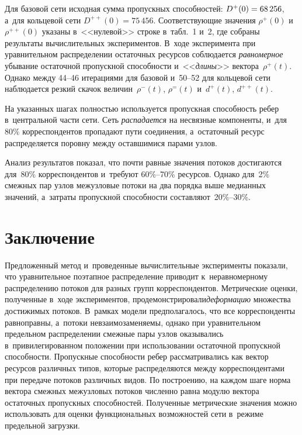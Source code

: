\begin{multicols}{2}
Для базовой сети исходная сумма пропускных способностей:
$D^+(0)\hm=68\,256$, а~для кольцевой сети $D^{++}(0)=75\,456$.
Соответствующие значения $\rho^+(0)$ и~$\rho^{++}(0)$ указаны в~<<нулевой>> строке 
в~табл.~1 и~2, где собраны результаты
вычислительных экспериментов. В~ходе эксперимента при
уравнительном распределении остаточных ресурсов соблюдается
\textit{равномерное} убывание остаточной пропускной спо\-соб\-ности и~<<\textit{длины}>> вектора~$\rho^+(t)$. 
Однако между 44--46
итерациями для базовой и~50--52 для кольцевой сети наблюдается
резкий скачок величин~$\rho^-(t)$, $\rho^{=}(t)$ и~$d^+(t)$,
$d^{++}(t)$.

На указанных шагах полностью используется пропускная способность
ребер в~центральной час\-ти сети. Сеть \textit{распадается} на
несвязные компоненты, и~для $80\%$ корреспондентов пропадают пути
соединения, а~остаточный ресурс распределяется поровну между
оставшимися парами узлов.

Анализ результатов показал, что почти равные значения потоков
достигаются для~80\% корреспондентов и~требуют 60\%--70\%
ресурсов. Однако для~2\% смежных  пар узлов межузловые потоки на
два порядка выше медианных значений, а~затраты пропускной
способности  со\-став\-ля\-ют~20\%--30\%.








\section{Заключение}

Предложенный метод и~проведенные вычислительные эксперименты
показали, что уравнительное поэтапное распределение   приводит 
к~неравномерному  распределению   потоков  для разных групп\linebreak
корреспондентов.    Метрические оценки, полученные  в~ходе
экспериментов, продемонстрировали\linebreak \textit{деформацию} множества
достижимых потоков. В~рамках модели   предполагалось, что  все
корреспонденты  равноправны, а~потоки невзаимозаменяемы,  однако
при уравнительном предельном  распределении  смежные  пары узлов
оказывались в~привилегированном положении при использовании
остаточной пропускной способности. Пропускные способности  ребер
рассматривались  как вектор   ресурсов  различных типов,  которые
распределяются между корреспондентами   при передаче  потоков
различных видов.  По построению, на каж\-дом шаге норма вектора
смежных   межузловых    потоков численно равна   модулю вектора
остаточных  пропускных способностей.   Полученные мет\-ри\-че\-ские
значения  можно использовать  для   оценки функциональных
возможностей сети  в~режиме  предельной загрузки.


\end{multicols}
